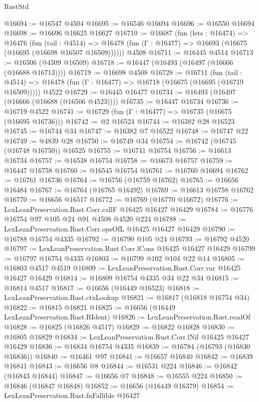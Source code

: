 \begin{lexlean}{RustStd}
\begin{coremodule}
{\begin{coremodule}
{{{{{{{{{{{{{{{{{{{{{{{{{{{{{{{{{{{{{{{{{{{{{{{{{{{{{{{@16694 := @16547 @4504
@16695 := @16546 @16694
@16696 := @16550 @16694
@16698 := @16696 @16625 @16627
@16710 := @16687
    (fun (lets : @16474) =>
    @16476
      (fun (tail : @4514) =>
      @16478 (fun (Γ : @16477) => @16693 (@16675 (@16695 (@16698 @16507 @16509))))))
    @4508
@16711 := @16445 @4514
@16713 := @16506 (@4509 @16509)
@16718 := @16447 (@16493 (@16497 (@16666 (@16688 @16713))))
@16719 := @16698 @4508
@16728 := @16711
    (fun (tail : @4514) => @16478 (fun (Γ : @16477) => @16718 (@16675 (@16695 (@16719 @16509)))))
    @4522
@16729 := @16445 @16477
@16734 := @16493 (@16497 (@16666 (@16688 (@16506 @4523))))
@16735 := @16447 @16734
@16736 := @16719 @4522
@16741 := @16729 (fun (Γ : @16477) => @16735 (@16675 (@16695 @16736)))
@16742 := @2 @16524
@16744 := @16382 @28 @16523
@16745 := @16744 @34
@16747 := @16382 @7 @16522
@16748 := @16747 @22
@16749 := @4839 @28
@16750 := @16749 @34
@16754 := @16742 (@16745 (@16748 @16750)) @16525
@16755 := @16741 @16754
@16756 := @16613 @16734
@16757 := @16538 @16754
@16758 := @16673 @16757
@16759 := @16447 @16758
@16760 := @16545 @16754
@16761 := @16760 @16694
@16762 := @16761 @16736
@16764 := @16756 (@16759 @16762)
@16765 := @16656 @16484
@16767 := @16764 (@16765 @16492)
@16769 := @16613 @16758 @16762
@16770 := @16656 @16517
@16772 := @16769 (@16770 @16672)
@16776 := LexLeanPreservation.Rust.Corr.callF @16425 @16427 @16429
@16784 := @16776 @16754 @97 @105 @24 @91 @4508 @4520 @224
@16788 := LexLeanPreservation.Rust.Corr.opsOfL @16425 @16427 @16429
@16790 := @16788 @16754 @4335
@16792 := @16790 @105 @24
@16793 := @16792 @4520
@16797 := LexLeanPreservation.Rust.Corr.lCons @16425 @16427 @16429
@16799 := @16797 @16754 @4335
@16803 := @16799 @102 @104 @22 @14
@16805 := @16803 @4517 @4519
@16809 := LexLeanPreservation.Rust.Corr.var @16425 @16427 @16429
@16814 := @16809 @16754 @4335 @34 @22 @34
@16815 := @16814 @4517
@16817 := @16656 (@16449 @16523)
@16818 := LexLeanPreservation.Rust.ctxLookup
@16821 := @16817 (@16818 @16754 @34)
@16822 := @16815 @16821
@16825 := @16656 (@16449 LexLeanPreservation.Rust.RIdent)
@16826 := LexLeanPreservation.Rust.readOf
@16828 := @16825 (@16826 @4517)
@16829 := @16822 @16828
@16830 := @16805 @16829
@16834 := LexLeanPreservation.Rust.Corr.lNil @16425 @16427 @16429
@16836 := @16834 @16754 @4335
@16839 := @16784 (@16793 (@16830 @16836))
@16840 := @16461 @97
@16841 := @16657 @16840
@16842 := @16839 @16841
@16843 := @16656 @8
@16844 := @16531 @224
@16846 := @16842 (@16843 @16844)
@16847 := @16656 @7
@16848 := @16555 @224
@16850 := @16846 (@16847 @16848)
@16852 := @16656 (@16449 @16379)
@16854 := LexLeanPreservation.Rust.fnFallible @16427
}}}}}}}}}}}}}}}}}}}}}}}}}}}}}}}}}}}}}}}}}}}}}}}}}}}}}}}
\end{coremodule}}
\end{coremodule}
\end{lexlean}
